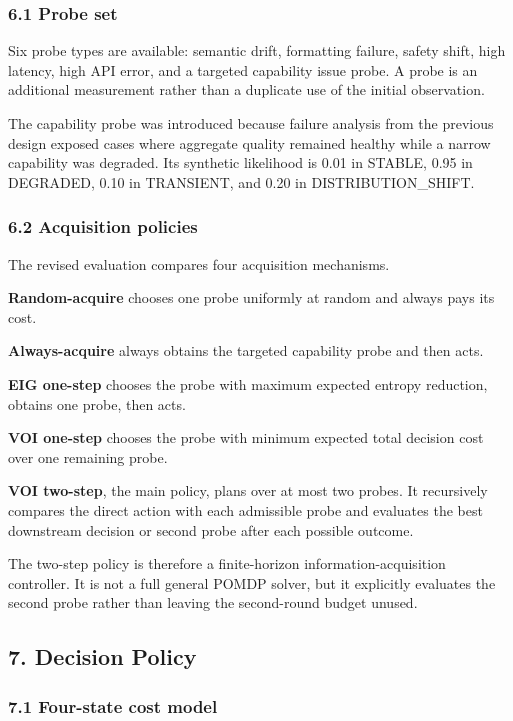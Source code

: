 \documentclass[
]{article}
\begin{document}
\subsubsection{6.1 Probe set}\label{61-probe-set}

Six probe types are available: semantic drift, formatting failure, safety shift, high latency, high API error, and a targeted capability issue probe. A probe is an additional measurement rather than a duplicate use of the initial observation.

The capability probe was introduced because failure analysis from the previous design exposed cases where aggregate quality remained healthy while a narrow capability was degraded. Its synthetic likelihood is 0.01 in STABLE, 0.95 in DEGRADED, 0.10 in TRANSIENT, and 0.20 in DISTRIBUTION\_SHIFT.

\subsubsection{6.2 Acquisition policies}\label{62-acquisition-policies}

The revised evaluation compares four acquisition mechanisms.

\textbf{Random-acquire} chooses one probe uniformly at random and always pays its cost.

\textbf{Always-acquire} always obtains the targeted capability probe and then acts.

\textbf{EIG one-step} chooses the probe with maximum expected entropy reduction, obtains one probe, then acts.

\textbf{VOI one-step} chooses the probe with minimum expected total decision cost over one remaining probe.

\textbf{VOI two-step}, the main policy, plans over at most two probes. It recursively compares the direct action with each admissible probe and evaluates the best downstream decision or second probe after each possible outcome.

The two-step policy is therefore a finite-horizon information-acquisition controller. It is not a full general POMDP solver, but it explicitly evaluates the second probe rather than leaving the second-round budget unused.

\subsection{7. Decision Policy}\label{7-decision-policy}

\subsubsection{7.1 Four-state cost model}\label{71-four-state-cost-model}
\end{document}
